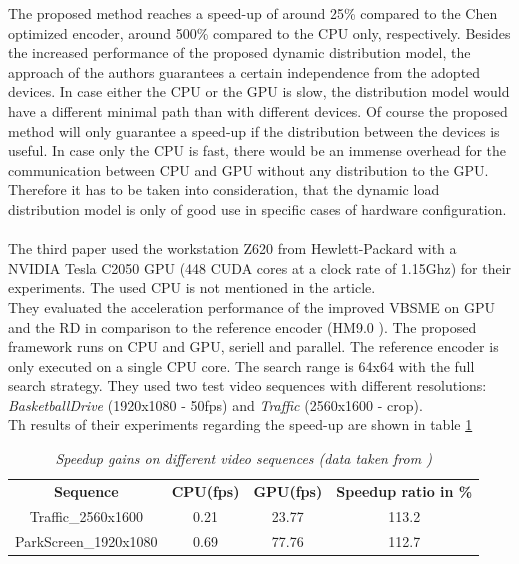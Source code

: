 The proposed method reaches a speed-up of around 25\% compared to the Chen optimized encoder, around 500\% compared to the CPU only, respectively. Besides the increased performance of the proposed dynamic distribution model, the approach of the authors guarantees a certain independence from the adopted devices. In case either the CPU or the GPU is slow, the distribution model would have a different minimal path than with different devices. Of course the proposed method will only guarantee a speed-up if the distribution between the devices is useful. In case only the CPU is fast, there would be an immense overhead for the communication between CPU and GPU without any distribution to the GPU. Therefore it has to be taken into consideration, that the dynamic load distribution model is only of good use in specific cases of hardware configuration.\\
\\ 
The third paper \cite{Paper3} used the workstation Z620 from Hewlett-Packard with a NVIDIA Tesla C2050 GPU (448 CUDA cores at a clock rate of 1.15Ghz) for their experiments. The used CPU is not mentioned in the article.\\
They evaluated the acceleration performance of the improved VBSME on GPU and the RD in comparison to the reference encoder (HM9.0 \cite{hmencoder}). The proposed framework runs on CPU and GPU, seriell and parallel. The reference encoder is only executed on a single CPU core. The search range is 64x64 with the full search strategy. They used two test video sequences with different
resolutions: \textit{BasketballDrive} (1920x1080 - 50fps) and
\textit{Traffic} (2560x1600 - crop).\\
Th results of their experiments regarding the speed-up are shown in table \ref{hevc_table_result}

\begin{table}[ht]
  \centering
  \begin{tabular}{cccc}
    \textbf{Sequence} & \textbf{CPU(fps)} & \textbf{GPU(fps)} & \textbf{Speedup ratio in \%} \\
    Traffic\_2560x1600 & 0.21 & 23.77 & 113.2\\
    ParkScreen\_1920x1080 & 0.69 & 77.76 & 112.7\\
 \end{tabular}
 \caption{ \label{hevc_table_result}{\it Speedup gains on different video sequences (data taken from \cite{Paper3})}}
\end{table}

